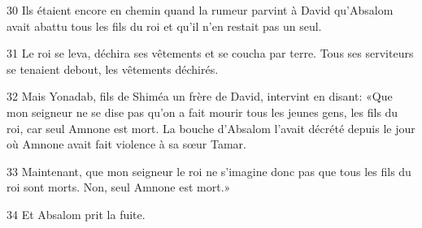 
30 Ils étaient encore en chemin quand la rumeur parvint à David qu’Absalom avait abattu tous les fils du roi et qu’il n’en restait pas un seul.

31 Le roi se leva, déchira ses vêtements et se coucha par terre. Tous ses serviteurs se tenaient debout, les vêtements déchirés.

32 Mais Yonadab, fils de Shiméa un frère de David, intervint en disant: «Que mon seigneur ne se dise pas qu’on a fait mourir tous les jeunes gens, les fils du roi, car seul Amnone est mort. La bouche d’Absalom l’avait décrété depuis le jour où Amnone avait fait violence à sa sœur Tamar.

33 Maintenant, que mon seigneur le roi ne s’imagine donc pas que tous les fils du roi sont morts. Non, seul Amnone est mort.»

34 Et Absalom prit la fuite.